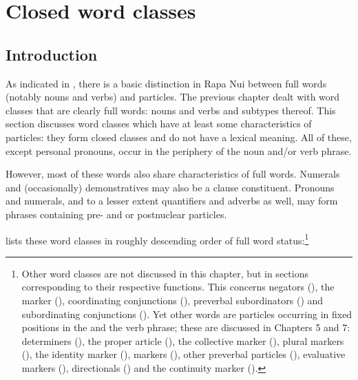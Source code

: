 \chapter[Closed word classes]{Closed word classes}\label{ch:4}
\section{Introduction}\label{sec:4.1}

As indicated in , there is a basic distinction in Rapa Nui between full words (notably nouns and verbs) and particles. The previous chapter dealt with word classes that are clearly full words: nouns and verbs and subtypes thereof. This section discusses word classes which have at least some characteristics of particles: they form closed classes and do not have a lexical meaning. All of these, except personal pronouns, occur in the periphery of the noun and/or verb phrase.

However, most of these words also share characteristics of full words. Numerals and (occasionally) demonstratives may also be a clause constituent. Pronouns and numerals, and to a lesser extent quantifiers and adverbs as well, may form phrases containing pre- and or postnuclear particles. 

 lists these word classes in roughly descending order of full word status:\footnote{\label{fn:159}Other word classes are not discussed in this chapter, but in sections corresponding to their respective functions. This concerns negators (), the  marker (), coordinating conjunctions (), preverbal subordinators () and subordinating conjunctions (). Yet other words are particles occurring in fixed positions in the  and the verb phrase; these are discussed in Chapters 5 and 7: determiners (), the proper article (), the collective marker (), plural markers (), the identity marker (),  markers (), other preverbal particles (), evaluative markers (), directionals () and the continuity marker ().}

